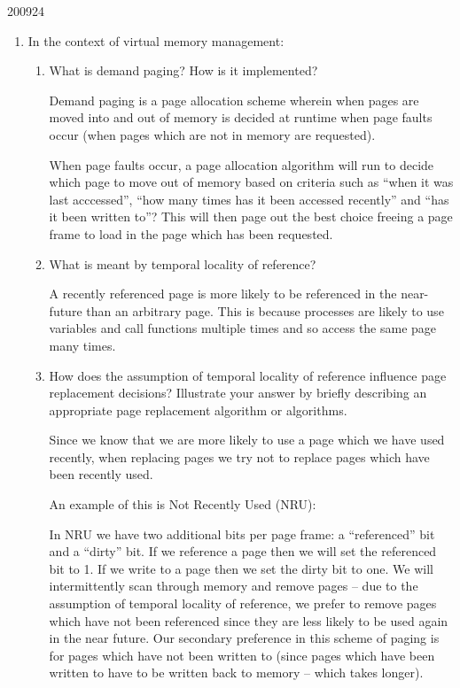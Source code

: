 \documentclass[10pt,\jkfside,a4paper]{article}
\begin{document}
\begin{examquestion}{2009}{2}{4}

\begin{enumerate}

\item In the context of virtual memory management:

\begin{enumerate}

\item What is demand paging? How is it implemented?

Demand paging is a page allocation scheme wherein when pages are moved into and out of memory 
is decided at runtime when page faults occur (when pages which are not in memory 
are requested).

When page faults occur, a page allocation algorithm will run to decide which page to move out of 
memory based on criteria such as ``when it was last acccessed'', ``how many times has 
it been accessed recently'' and ``has it been written to''? This will then page out the 
best choice freeing a page frame to load in the page which has been requested.

\item What is meant by temporal locality of reference?

A recently referenced page is more likely to be referenced in the near-future than an 
arbitrary page. This is because processes are likely to use variables and call functions 
multiple times and so access the same page many times.

\item How does the assumption of temporal locality of reference influence page
replacement decisions? Illustrate your answer by briefly describing an
appropriate page replacement algorithm or algorithms.

Since we know that we are more likely to use a page which we have used recently, when 
replacing pages we try not to replace pages which have been recently used. 

An example of this is Not Recently Used (NRU):

In NRU we have two additional bits per page frame: a ``referenced'' bit and a ``dirty'' bit. 
If we reference a page then we will set the referenced bit to 1. If we write to a page then 
we set the dirty bit to one. We will intermittently scan through memory and remove 
pages -- due to the assumption of temporal locality of reference, we prefer to remove pages which 
have not been referenced since they are less likely to be used again in the near future. 
Our secondary preference in this scheme of paging is for pages which have not been written 
to (since pages which have been written to have to be written back to memory -- which takes 
longer).


\end{enumerate}
\end{enumerate}
\end{examquestion}
\end{document}
